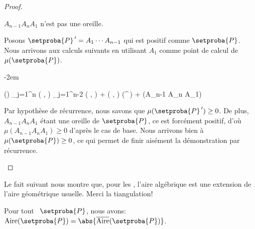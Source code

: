 \begin{proof}
\begin{itemize}
\begin{multicols}{2}
\begin{center}
        		\smallskip
    	   		$A_{n-1} A_n A_1$ n'est pas une oreille.
    		\end{center}
    	\end{multicols}


		\noindent
		Posons $\setproba{P}^{\,\prime} = A_1 \cdots A_{n-1}$ qui est positif comme $\setproba{P}$. 
		Nous arrivons aux calculs suivants en utilisant $A_1$ comme point de calcul de $\mu(\setproba{P})$.

		\leavevmode\kern-2em%
		\begin{stepcalc}[style=ar*]
			\mu()
		\explnext{}
			\dsum_{j=1}^{n} \det \big(  ,  \big)
		          {}
			\dsum_{j=1}^{n-2} \det \big(  ,  \big)
			+
			\det \big(  ,  \big)
			\mu(^{\,\prime})
			+
			\mu(A_{n-1} A_n A_1)
		\end{stepcalc}


		\noindent
		Par hypothèse de récurrence, nous savons que
		$\mu(\setproba{P}^{\,\prime}) \geq 0$.
		De plus, $A_{n-1} A_n A_1$ étant une oreille de $\setproba{P}$, 
		ce  est forcément positif, d'où $\mu(A_{n-1} A_n A_1) \geq 0$ d'après le cas de base.
		Nous arrivons bien à $\mu(\setproba{P}) \geq 0$, ce qui permet de finir aisément la démonstration par récurrence.
	\end{itemize}
	
	\null\vspace{-6ex}
\end{proof}




Le fait suivant nous montre que, pour les \ngones, l'aire algébrique est une extension de l'aire géométrique usuelle. Merci la tiangulation!


\begin{fact} \label{sarea-ngone}
    Pour tout \ngone\ $\setproba{P}$, nous avons:
    $\area{\setproba{P}} = \abs{\sarea{\setproba{P}}}$.
\end{fact}


